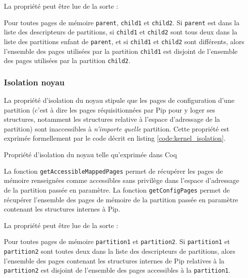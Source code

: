 			La propriété peut être lue de la sorte :
			\begin{theorem}
				Pour toutes pages de mémoire \texttt{parent}, \texttt{child1} et \texttt{child2}. Si \texttt{parent} est dans la liste des descripteurs de partitions, si \texttt{child1} et \texttt{child2} sont tous deux dans la liste des partitions enfant de \texttt{parent}, et si \texttt{child1} et \texttt{child2} sont différents, alors l'ensemble des pages utilisées par la partition \texttt{child1} est disjoint de l'ensemble des pages utilisées par la partition \texttt{child2}.
			\end{theorem}

			\subsubsection{Isolation noyau}

			La propriété d'isolation du noyau stipule que les pages de configuration d'une partition (c'est à dire les pages réquisitionnées par Pip pour y loger ses structures, notamment les structures relative à l'espace d'adressage de la partition) sont inaccessibles à \emph{n'importe quelle} partition.
			Cette propriété est exprimée formellement par le code décrit en listing \ref{code:kernel_isolation}.

			\begin{listing}[!ht]
				\caption{Propriété d'isolation du noyau telle qu'exprimée dans Coq}
				\label{code:kernel_isolation}
			\end{listing}

			La fonction \texttt{getAccessibleMappedPages} permet de récupérer les pages de mémoire renseignées comme accessibles sans privilège dans l'espace d'adressage de la partition passée en paramètre. La fonction \texttt{getConfigPages} permet de récupérer l'ensemble des pages de mémoire de la partition passée en paramètre contenant les structures internes à Pip.

			La propriété peut être lue de la sorte :
			\begin{theorem}
				Pour toutes pages de mémoire \texttt{partition1} et \texttt{partition2}. Si \texttt{partition1} et \texttt{partition2} sont toutes deux dans la liste des descripteurs de partitions, alors l'ensemble des pages contenant les structures internes de Pip relatives à la \texttt{partition2} est disjoint de l'ensemble des pages accessibles à la \texttt{partition1}.
			\end{theorem}

